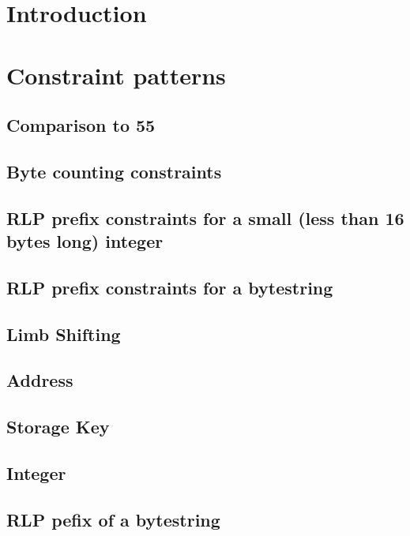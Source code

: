 \section{Introduction}

\section{Constraint patterns}
\subsection{Comparison to 55}                       
\subsection{Byte counting constraints}                         
\subsection{RLP prefix constraints for a small (less than 16 bytes long) integer}              
\subsection{RLP prefix constraints for a bytestring}              
\subsection{Limb Shifting} 

\subsection{Address} 
\subsection{Storage Key} 
\subsection{Integer} 
\subsection{RLP pefix of a bytestring} 
